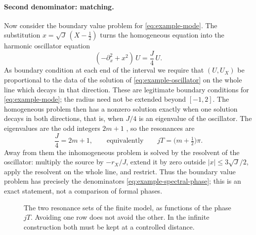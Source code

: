 \paragraph{Second denominator: matching.}
Now consider the boundary value problem for \eqref{eq:example-mode}.
The substitution $x=\sqrt J\,(X-\tfrac12)$ turns the homogeneous
equation into the harmonic oscillator equation
\begin{equation}\label{eq:example-oscillator}
 (-\partial_x^2+x^2)\,U=\frac J4\,U .
\end{equation}
As boundary condition at each end of the interval we require that
$(U,U_X)$ be proportional to the data of the solution of
\eqref{eq:example-oscillator} on the whole line which decays in that
direction. These are legitimate boundary conditions for
\eqref{eq:example-mode}; the radius need not be extended beyond
$[-1,2]$. The homogeneous problem then has a nonzero solution exactly
when one solution decays in both directions, that is, when $J/4$ is an
eigenvalue of the oscillator. The eigenvalues are the odd integers
$2m+1$ \cite[Section~8.3]{Teschl2009}, so the resonances are
\begin{equation}\label{eq:example-spectral-phase}
 \frac J4=2m+1,
 \qquad\text{equivalently}\qquad
 jT=\bigl(m+\tfrac12\bigr)\pi .
\end{equation}
Away from them the inhomogeneous problem is solved by the resolvent of
the oscillator: multiply the source by $-r_X/J$, extend it by zero
outside $|x|\le3\sqrt J/2$, apply the resolvent on the whole line, and
restrict. Thus the boundary value problem has precisely the
denominators \eqref{eq:example-spectral-phase}; this is an exact
statement, not a comparison of formal phases.

\begin{figure}[htbp]
\centering
{}
\caption{The two resonance sets of the finite model, as functions of
the phase $jT$. Avoiding one row does not avoid the other. In the
infinite construction both must be kept at a controlled distance.}
\label{fig:two-denominators}
\end{figure}

